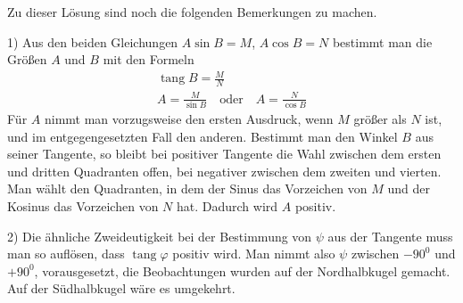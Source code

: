 Zu dieser Lösung sind noch die folgenden Bemerkungen zu machen.

1) Aus den beiden Gleichungen $A\sin B=M$, $A\cos B=N$ bestimmt man die Größen $A$ und $B$ mit den Formeln
\[
\begin{gathered}
\operatorname{tang}B=\frac{M}{N}\\
A=\frac{M}{\sin B}\quad\text{oder}\quad A=\frac{N}{\cos B}
\end{gathered}
\]
Für $A$ nimmt man vorzugsweise den ersten Ausdruck, wenn $M$ größer als $N$ ist, und im entgegengesetzten Fall den anderen. Bestimmt man den Winkel $B$ aus seiner Tangente, so bleibt bei positiver Tangente die Wahl zwischen dem ersten und dritten Quadranten offen, bei negativer zwischen dem zweiten und vierten. Man wählt den Quadranten, in dem der Sinus das Vorzeichen von $M$ und der Kosinus das Vorzeichen von $N$ hat. Dadurch wird $A$ positiv.

2) Die ähnliche Zweideutigkeit bei der Bestimmung von $\psi$ aus der Tangente muss man so auflösen, dass $\operatorname{tang}\varphi$ positiv wird. Man nimmt also $\psi$ zwischen $-90^0$ und $+90^0$, vorausgesetzt, die Beobachtungen wurden auf der Nordhalbkugel gemacht. Auf der Südhalbkugel wäre es umgekehrt.

